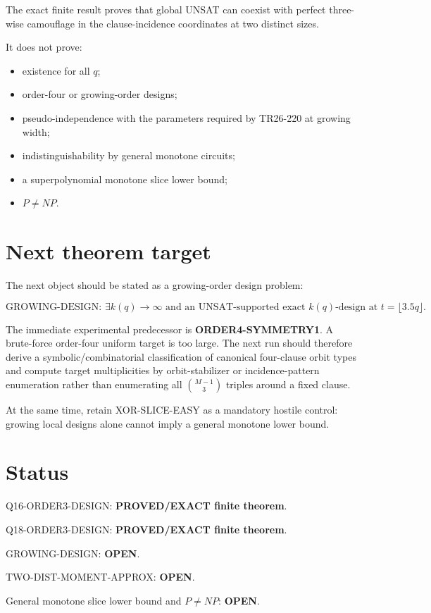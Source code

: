 \documentclass[11pt]{article}
\begin{document}
The exact finite result proves that global UNSAT can coexist with perfect
three-wise camouflage in the clause-incidence coordinates at two distinct
sizes.

It does not prove:
\begin{itemize}
\item existence for all \(q\);
\item order-four or growing-order designs;
\item pseudo-independence with the parameters required by TR26-220 at growing
width;
\item indistinguishability by general monotone circuits;
\item a superpolynomial monotone slice lower bound;
\item \(P\ne NP\).
\end{itemize}

\section{Next theorem target}

The next object should be stated as a growing-order design problem:

\[
\boxed{
\text{GROWING-DESIGN: }
\exists k(q)\to\infty
\text{ and an UNSAT-supported exact }k(q)\text{-design at }t=\lfloor3.5q\rfloor.
}
\]

The immediate experimental predecessor is \textbf{ORDER4-SYMMETRY1}.
A brute-force order-four uniform target is too large.  The next run should
therefore derive a symbolic/combinatorial classification of canonical
four-clause orbit types and compute target multiplicities by orbit-stabilizer
or incidence-pattern enumeration rather than enumerating all
\(\binom{M-1}{3}\) triples around a fixed clause.

At the same time, retain XOR-SLICE-EASY as a mandatory hostile control:
growing local designs alone cannot imply a general monotone lower bound.

\section{Status}

Q16-ORDER3-DESIGN: \textbf{PROVED/EXACT finite theorem}.

Q18-ORDER3-DESIGN: \textbf{PROVED/EXACT finite theorem}.

GROWING-DESIGN: \textbf{OPEN}.

TWO-DIST-MOMENT-APPROX: \textbf{OPEN}.

General monotone slice lower bound and \(P\ne NP\): \textbf{OPEN}.
\end{document}
